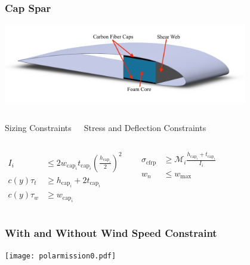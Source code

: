 \documentclass{beamer}
\begin{document}
\begin{frame}
    \frametitle{Cap Spar}

    \pause
    \begin{center}
    \includegraphics[width=0.8\textwidth]{capspar.jpg}
    \end{center}

    \pause
    \begin{columns}
        \begin{center}
        Sizing Constraints
        \end{center}
        \begin{center}
        Stress and Deflection Constraints
        \end{center}
    \end{columns}
    
    \begin{columns}
        \begin{align*}
            I_i &\leq 2w_{\text{cap}_i}t_{\text{cap}_i}\left(\frac{h_{\text{cap}_i}}{2}\right)^2 \\
            c(y)\tau_t &\geq h_{\text{cap}_i} + 2t_{\text{cap}_i} \\
            c(y)\tau_w &\geq w_{\text{cap}_i} 
        \end{align*}

        \begin{align*}
            \sigma_{\text{cfrp}} &\geq \mathcal{M}_i \frac{h_{\text{cap}_i}+t_{\text{cap}_i}}{I_i}\\
            w_n &\leq w_{\text{max}}
        \end{align*}
        
    \end{columns}

\end{frame}

\begin{frame}
    \frametitle{With and Without Wind Speed Constraint}

    \begin{center}
    \texttt{[image: polarmission0.pdf]} \\
    \end{center}

\end{frame}
\end{document}
